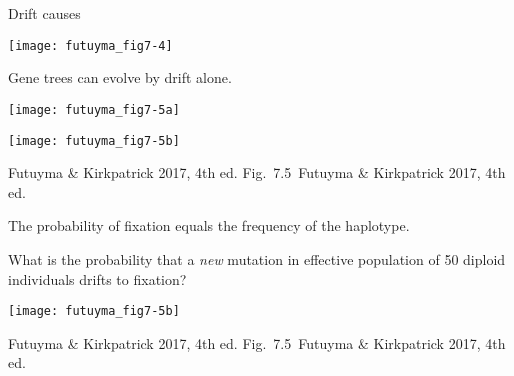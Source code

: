 \documentclass[t]{beamer}
\newcommand{\futuyma}[1]{%
	\ifthenelse{\isempty{#1}}%
	{Futuyma \& Kirkpatrick 2017, 4th ed.}%
	{Fig.~#1~Futuyma \& Kirkpatrick 2017, 4th ed.}%
}
\newcommand{\backskip}{\vspace{-0.5\baselineskip}}
\begin{document}

\begin{frame}[t]{Drift causes }
\centering

\texttt{[image: futuyma\_fig7-4]}
\end{frame}


\begin{frame}{Gene trees can evolve by drift alone.}
\backskip

\begin{multicols}{2}
\noindent \texttt{[image: futuyma\_fig7-5a]}

\columnbreak

\pause
\noindent \texttt{[image: futuyma\_fig7-5b]}

\end{multicols}

\vfilll

\tinyfill \futuyma{7.5}

\end{frame}


\begin{frame}{The probability of fixation equals the frequency of the haplotype.}
\backskip

\begin{multicols}{2}

\hangpara What is the probability that a \emph{new} mutation in effective population of 50 diploid individuals drifts to fixation?



\columnbreak

\noindent \texttt{[image: futuyma\_fig7-5b]}


\end{multicols}

\vfilll

\tinyfill \futuyma{7.5}

\end{frame}
\end{document}
